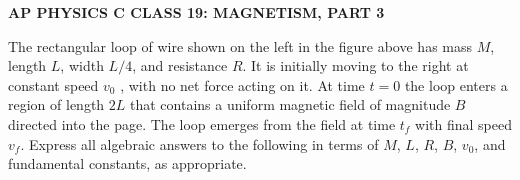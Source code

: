 \documentclass{../../oss-apphys-exam}
\begin{document}

\begin{center}
  \textbf{AP PHYSICS C CLASS 19: MAGNETISM, PART 3}
\end{center}
  

\begin{questions}
  \question The rectangular loop of wire shown on the left in the figure above
  has mass $M$, length $L$, width $L/4$, and resistance $R$. It is initially
  moving to the right at constant speed $v_0$ , with no net force acting on
  it. At time $t=0$ the loop enters a region of length $2L$ that contains a
  uniform magnetic field of magnitude $B$ directed into the page. The loop
  emerges from the field at time $t_f$ with final speed $v_f$. Express all
  algebraic answers to the following in terms of $M$, $L$, $R$, $B$, $v_0$,
  and fundamental constants, as appropriate.
\end{questions}
\end{document}
